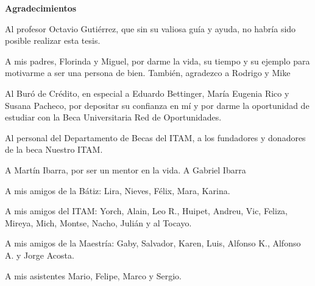 \begin{center}
{\huge \bfseries Agradecimientos\\}
\end{center}

Al profesor Octavio Gutiérrez, que sin su valiosa guía y ayuda, no habría sido posible realizar esta tesis.

A mis padres, Florinda y Miguel, por darme la vida, su tiempo y su ejemplo para motivarme a ser una persona de bien. También, agradezco a Rodrigo y Mike 

Al Buró de Crédito, en especial a Eduardo Bettinger, María Eugenia Rico y Susana Pacheco, por depositar su confianza en mí y por darme la oportunidad de estudiar con la Beca Universitaria Red de Oportunidades.

Al personal del Departamento de Becas del ITAM, a los fundadores y donadores de la beca Nuestro ITAM.

A Martín Ibarra, por ser un mentor en la vida. A Gabriel Ibarra

A mis amigos de la Bátiz: Lira, Nieves, Félix, Mara, Karina.

A mis amigos del ITAM: Yorch, Alain, Leo R., Huipet, Andreu, Vic, Feliza, Mireya, Mich, Montse, Nacho, Julián y al Tocayo.

A mis amigos de la Maestría: Gaby, Salvador, Karen, Luis, Alfonso K., Alfonso A. y Jorge Acosta.

A mis asistentes Mario, Felipe, Marco y Sergio.

\clearpage